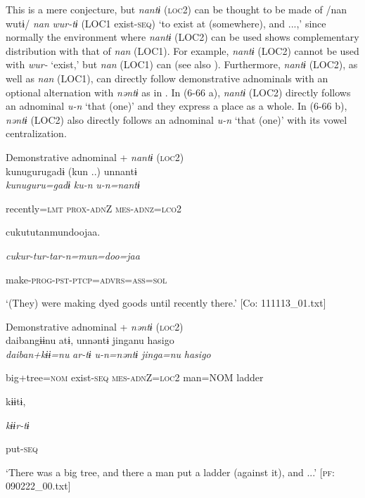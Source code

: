 This is a mere conjecture, but \textit{nantɨ} (\textsc{loc}2) can be thought to be made of /nan wutɨ/ \textit{nan} \textit{wur-tɨ} (LOC1 exist-\textsc{seq}) ‘to exist at (somewhere), and ...,’ since normally the environment where \textit{nantɨ} (LOC2) can be used shows complementary distribution with that of \textit{nan} (LOC1). For example, \textit{nantɨ} (LOC2) cannot be used with \textit{wur-} ‘exist,’ but \textit{nan} (LOC1) can (see also ). Furthermore, \textit{nantɨ} (LOC2), as well as \textit{nan} (LOC1), can directly follow demonstrative adnominals with an optional alternation with \textit{nəntɨ} as in . In (6-66 a), \textit{nantɨ} (LOC2) directly follows an adnominal \textit{u-n} ‘that (one)’ and they express a place as a whole. In (6-66 b), \textit{nəntɨ} (LOC2) also directly follows an adnominal \textit{u-n} ‘that (one)’ with its vowel centralization.

\ea\label{ex:6-66}
\ea Demonstrative adnominal + \textit{nantɨ} (\textsc{loc}2)\\
{\TM}
\gll  kunugurugadɨ  (kun ..)  unnantɨ\\

      \textit{kunuguru=gadɨ}  \textit{ku-n}  \textit{u-n=nantɨ}

      recently=\textsc{lmt}  \textsc{prox}-\textsc{adn}Z  \textsc{mes}-\textsc{adnz}=\textsc{lco}2

      cukututanmundoojaa.

      \textit{cukur-tur-tar-n=mun=doo=jaa}

      make-\textsc{prog}-\textsc{pst}-\textsc{ptcp}=\textsc{advrs}=\textsc{ass}=\textsc{sol}

\glt ‘(They) were making dyed goods until recently there.’ [Co: 111113\_01.txt]
\z

 \ex Demonstrative adnominal + \textit{nəntɨ} (\textsc{loc}2)\\
{\TM}
\gll  daibangɨɨnu  atɨ,  unnəntɨ  jinganu  {\textbar}hasigo{\textbar}\\

      \textit{daiban+kɨɨ=nu}  \textit{ar-tɨ}  \textit{u-n=nəntɨ}  \textit{jinga=nu}  \textit{hasigo}

      big+tree=\textsc{nom}  exist-\textsc{seq}  \textsc{mes}-\textsc{adn}Z=\textsc{loc}2  man=NOM  ladder

      kɨɨtɨ,

      \textit{kɨɨr-tɨ}

      put-\textsc{seq}

\glt ‘There was a big tree, and there a man put a ladder (against it), and ...’ [\textsc{pf}: 090222\_00.txt]
\z

